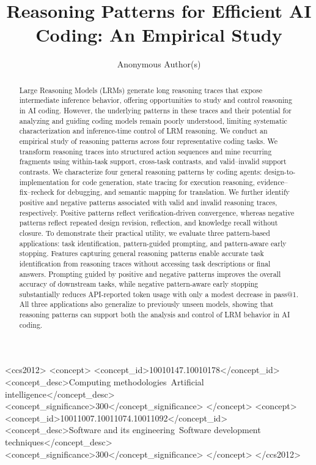 \documentclass[acmsmall,screen,review,anonymous]{acmart}
\begin{document}
\title{Reasoning Patterns for Efficient AI Coding: An Empirical Study
}

\author{Anonymous Author(s)}

\begin{abstract}
Large Reasoning Models (LRMs) generate long reasoning traces that expose intermediate inference behavior, offering opportunities to study and control reasoning in AI coding. However, the underlying patterns in these traces and their potential for analyzing and guiding coding models remain poorly understood, limiting systematic characterization and inference-time control of LRM reasoning.
We conduct an empirical study of reasoning patterns across four representative coding tasks. We transform reasoning traces into structured action sequences and mine recurring fragments using within-task support, cross-task contrasts, and valid--invalid support contrasts. We characterize four general reasoning patterns by coding agents: design-to-implementation for code generation, state tracing for execution reasoning, evidence--fix--recheck for debugging, and semantic mapping for translation. We further identify positive and negative patterns associated with valid and invalid reasoning traces, respectively. Positive patterns reflect verification-driven convergence, whereas negative patterns reflect repeated design revision, reflection, and knowledge recall without closure.
To demonstrate their practical utility, we evaluate three pattern-based applications: task identification, pattern-guided prompting, and pattern-aware early stopping. Features capturing general reasoning patterns enable accurate task identification from reasoning traces without accessing task descriptions or final answers. Prompting guided by positive and negative patterns improves the overall accuracy of downstream tasks, while negative pattern-aware early stopping substantially reduces API-reported token usage with only a modest decrease in pass@1. All three applications also generalize to previously unseen models, showing that reasoning patterns can support both the analysis and control of LRM behavior in AI coding.
\end{abstract}
\begin{CCSXML}
<ccs2012>
   <concept>
       <concept_id>10010147.10010178</concept_id>
       <concept_desc>Computing methodologies~Artificial intelligence</concept_desc>
       <concept_significance>300</concept_significance>
       </concept>
   <concept>
       <concept_id>10011007.10011074.10011092</concept_id>
       <concept_desc>Software and its engineering~Software development techniques</concept_desc>
       <concept_significance>300</concept_significance>
       </concept>       
 </ccs2012>
\end{CCSXML}
\end{document}
